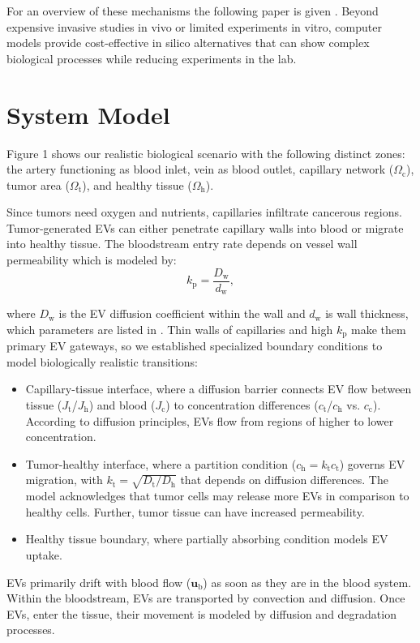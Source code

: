 \documentclass[sigconf]{acmart}
\begin{document}
For an overview of these mechanisms the following paper is given \cite{Sykov__2008}. Beyond expensive invasive studies in vivo or limited experiments in vitro, computer models provide cost-effective in silico alternatives that can show complex biological processes while reducing experiments in the lab. 

\section{System Model}
\label{subsec: sys-model}
Figure 1 shows our realistic biological scenario with the following distinct zones: the artery functioning as blood inlet, vein as blood outlet, capillary network ($\Omega_{\text{c}}$), tumor area ($\Omega_{\text{t}}$), and healthy tissue ($\Omega_{\text{h}}$). 

Since tumors need oxygen and nutrients, capillaries infiltrate cancerous regions. Tumor-generated EVs can either penetrate capillary walls into blood or migrate into healthy tissue. The bloodstream entry rate depends on vessel wall permeability which is modeled by:
\begin{displaymath}
  k_{\mathrm{p}}=\frac{D_{\mathrm{w}}}{d_{\mathrm{w}}},
\end{displaymath}

where $D_{\mathrm{w}}$ is the EV diffusion coefficient within the wall and $d_{\mathrm{w}}$ is wall thickness, which parameters are listed in \cite{Zoofaghari_2023}. Thin walls of capillaries and high $k_{\mathrm{p}}$ make them primary EV gateways, so we established specialized boundary conditions to model biologically realistic transitions:
\begin{itemize}
  \item Capillary-tissue interface, where a diffusion barrier connects EV flow between tissue ($J_{\text{t}}$/$J_{\text{h}}$) and blood ($J_{\text{c}}$) to concentration differences ($c_{\text{t}}$/$c_{\text{h}}$ vs. $c_{\text{c}}$). According to diffusion principles, EVs flow from regions of higher to lower concentration.
  \item Tumor-healthy interface, where a partition condition ($c_{\text{h}} = k_{\text{t}}c_{\text{t}}$) governs EV migration, with $k_{\text{t}} = \sqrt{D_{\text{t}}/D_{\text{h}}}$ that depends on diffusion differences. The model acknowledges that tumor cells may release more EVs in comparison to healthy cells. Further, tumor tissue can have increased permeability.
  \item Healthy tissue boundary, where partially absorbing condition models EV uptake.
\end{itemize}
EVs primarily drift with blood flow  ($\bm{u}_{\text{b}}$) as soon as they are in the blood system. Within the bloodstream, EVs are transported by convection and diffusion. Once EVs, enter the tissue, their movement is modeled by diffusion and degradation processes. 
\end{document}
